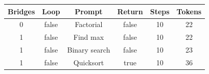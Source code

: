 \begin{table}[h]
\centering
\begin{tabular}{ |c|c|c|c|c|c| }
\hline
Bridges & Loop & Prompt & Return & Steps & Tokens \\
\hline
0 & false & Factorial & false & 10 & 22 \\
\hline
1 & false & Find max & false & 10 & 22 \\
\hline
1 & false & Binary search & false & 10 & 23 \\
\hline
1 & false & Quicksort & true & 10 & 36 \\
\hline
\end{tabular}
\end{table}
